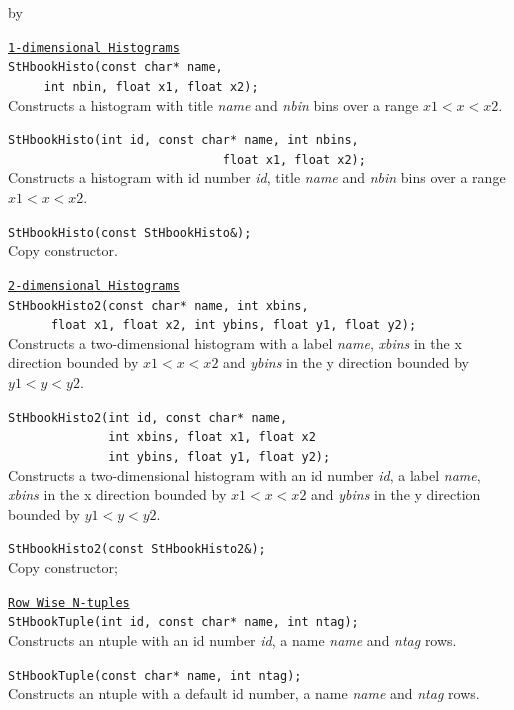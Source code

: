 \documentclass[twoside]{article}
\newcommand{\comp}[1]{\texttt{#1}}%
\newcommand{\entrylabel}[1]{\mbox{\textbf{{#1}}}\hfil}%
\newenvironment{entry}
{\begin{list}{}%
    {\renewcommand{\makelabel}{\entrylabel}%
     \setlength{\labelwidth}{90pt}%
     \setlength{\leftmargin}{\labelwidth}
     \advance\leftmargin by \labelsep%
      }%
    }%
  {\end{list}}
\newcommand{\Entrylabel}[1]%
{\raisebox{0pt}[1ex][0pt]{\makebox[\labelwidth][l]%
    {\parbox[t]{\labelwidth}{\hspace{0pt}\textbf{{#1}}}}}}
\newenvironment{Entry}%
{\renewcommand{\entrylabel}{\Entrylabel}\begin{entry}}%
  {\end{entry}}
\begin{document}
\begin{Entry}
  \comp{\underline{1-dimensional Histograms}} \\
  \verb+StHbookHisto(const char* name, +\\
  \verb+     int nbin, float x1, float x2);+ \\
  Constructs a histogram with title {\em name} and {\em nbin} bins over
  a range $x1 < x < x2$.

  \verb+StHbookHisto(int id, const char* name, int nbins,+\\
  \verb+                              float x1, float x2);+ \\
  Constructs a histogram with id number {\em id}, title {\em name}
  and {\em nbin} bins over a range $x1 < x < x2$.

  \verb+StHbookHisto(const StHbookHisto&);+\\
  Copy constructor.


  \comp{\underline{2-dimensional Histograms}} \\
  \verb+StHbookHisto2(const char* name, int xbins,+\\
  \verb+      float x1, float x2, int ybins, float y1, float y2);+ \\
  Constructs a two-dimensional histogram with a label {\em name},
  {\em xbins} in the x direction bounded by $x1 < x < x2$ and
  {\em ybins} in the y direction bounded by $y1 < y < y2$.

  \verb+StHbookHisto2(int id, const char* name, +\\
  \verb+              int xbins, float x1, float x2 +\\
  \verb+              int ybins, float y1, float y2); +\\
  Constructs a two-dimensional histogram with an id number {\em id},
  a label {\em name},
  {\em xbins} in the x direction bounded by $x1 < x < x2$ and
  {\em ybins} in the y direction bounded by $y1 < y < y2$.

  \verb+StHbookHisto2(const StHbookHisto2&);+\\
  Copy constructor;
  
  \comp{\underline{Row Wise N-tuples}} \\
  \verb+StHbookTuple(int id, const char* name, int ntag);+\\
  Constructs an ntuple with an id number {\em id}, a name {\em name}
  and {\em ntag} rows.
  
  \verb+StHbookTuple(const char* name, int ntag);+\\
  Constructs an ntuple with a default id number, a name {\em name}
  and {\em ntag} rows.
  

\end{Entry}
\end{document}
